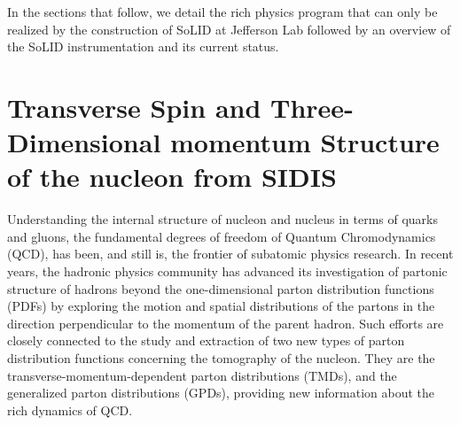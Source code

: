 \documentclass[12pt]{article}
\begin{document}
In the sections that follow, we detail the rich physics program that
can only be realized by the construction of SoLID at Jefferson Lab followed by an overview of the SoLID instrumentation and its current status.
% 



\section{Transverse Spin and Three-Dimensional momentum Structure of the nucleon from SIDIS}

Understanding the internal structure of nucleon and nucleus in terms of 
quarks and gluons, the fundamental degrees of freedom of Quantum Chromodynamics (QCD), has been, and still is, the frontier of subatomic physics research.
 In recent years, the hadronic physics community has
advanced its investigation of partonic structure of hadrons 
beyond the one-dimensional parton distribution functions (PDFs) by exploring the  motion and spatial distributions of the partons in the direction perpendicular to
the momentum of the parent hadron.
Such efforts are closely connected to the study and extraction of two new 
types of parton distribution functions concerning the tomography of 
the nucleon. They are the transverse-momentum-dependent parton distributions (TMDs), and the generalized
parton distributions (GPDs), providing new information about the rich dynamics of QCD. 
\end{document}
